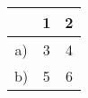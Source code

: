 \documentclass{article}
\begin{document}





\begin{center}
    \Large
    \begin{tabular}{ |c| c c| } 
    \hline
          & 1 & 2\\
        \hline
        a)& 3 & 4 \\
        \hline
        b)& 5 & 6 \\
        \hline
    \end{tabular}
\end{center} %
\end{document}
